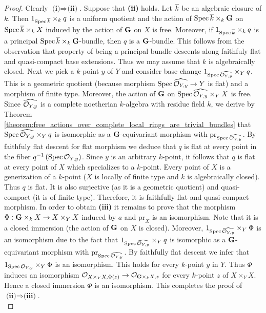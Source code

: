 \begin{proof}
Clearly $\textbf{(i)}\Rightarrow \textbf{(ii)}$. Suppose that \textbf{(ii)} holds. Let $\overline{k}$ be an algebraic closure of $k$. Then $1_{\mathrm{Spec}\, \overline{k}}\times_kq$ is a uniform quotient and the action of $\mathrm{Spec}\, \overline{k}\times_k\mathbf{G}$ on $\mathrm{Spec}\, \overline{k}\times_kX$ induced by the action of $\mathbf{G}$ on $X$ is free. Moreover, if $1_{\mathrm{Spec}\, \overline{k}}\times_kq$ is a principal $\mathrm{Spec}\, \overline{k}\times_k\mathbf{G}$-bundle, then $q$ is a $\mathbf{G}$-bundle. This follows from the observation that property of being a principal bundle descents along faithfuly flat and quasi-compact base extensions. Thus we may assume that $k$ is algebraically closed. Next we pick a $k$-point $y$ of $Y$ and consider base change $1_{\mathrm{Spec}\, \widehat{{\mathcal O}_{Y,y}}}\times_Yq$. This is a geometric quotient (because morphism $\mathrm{Spec}\, \widehat{{\mathcal O}_{Y,y}}\rightarrow Y$ is flat) and a morphism of finite type. Moreover, the action of $\mathbf{G}$ on $\mathrm{Spec}\, \widehat{{\mathcal O}_{Y,y}}\times_YX$ is free. Since $\widehat{{\mathcal O}_{Y,y}}$ is a complete noetherian $k$-algebra with residue field $k$, we derive by Theorem \ref{theorem:free_actions_over_complete_local_rings_are_trivial_bundles} that $\mathrm{Spec}\, \widehat{{\mathcal O}_{Y,y}}\times_Yq$ is isomorphic as a $\mathbf{G}$-equivariant morphism with $\mathrm{pr}_{\mathrm{Spec}\, \widehat{{\mathcal O}_{Y,y}}}$. By faithfuly flat descent for flat morphism we deduce that $q$ is flat at every point in the fiber $q^{-1}\left(\mathrm{Spec}\, {\mathcal O}_{Y,y}\right)$. Since $y$ is an arbitrary $k$-point, it follows that $q$ is flat at every point of $X$ which specializes to a $k$-point. Every point of $X$ is a generization of a $k$-point ($X$ is locally of finite type and $k$ is algebraically closed). Thus $q$ is flat. It is also surjective (as it is a geometric quotient) and quasi-compact (it is of finite type). Therefore, it is faithfully flat and quasi-compact morphism. In order to obtain \textbf{(iii)} it remains to prove that the morphism $\Phi:\mathbf{G}\times_kX\rightarrow X\times_YX$ induced by $a$ and $\mathrm{pr}_X$ is an isomorphism. Note that it is a closed immersion (the action of $\mathbf{G}$ on $X$ is closed). Moreover, $1_{\mathrm{Spec}\, \widehat{{\mathcal O}_{Y,y}}}\times_Y \Phi$ is an isomorphism due to the fact that $1_{\mathrm{Spec}\, \widehat{{\mathcal O}_{Y,y}}}\times_Yq$ is isomorphic as a $\mathbf{G}$-equivariant morphism with $\mathrm{pr}_{\mathrm{Spec}\, \widehat{{\mathcal O}_{Y,y}}}$. By faithfully flat descent we infer that $1_{\mathrm{Spec}\, {\mathcal O}_{Y,y}}\times_Y \Phi$ is an isomorphism. This holds for every $k$-point $y$ in $Y$. Thus $\Phi$ induces an isomorphism ${\mathcal O}_{X\times_YX,\Phi(z)}\rightarrow {\mathcal O}_{\mathbf{G}\times_kX,z}$ for every $k$-point $z$ of $X\times_YX$. Hence a closed immersion $\Phi$ is an isomorphism. This completes the proof of $\textbf{(ii)}\Rightarrow \textbf{(iii)}$.\\

\end{proof}
